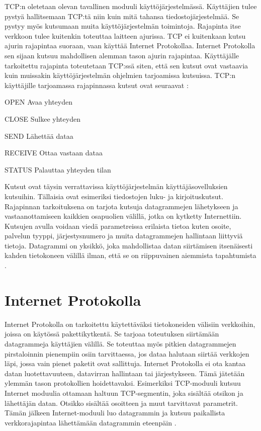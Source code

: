 \documentclass[utf8]{gradu3}
\begin{document}
TCP:n oletetaan olevan tavallinen moduuli käyttöjärjestelmässä. Käyttäjien tulee pystyä hallitsemaan TCP:tä niin kuin mitä tahansa tiedostojärjestelmää. Se pystyy myös kutsumaan muita käyttöjärjestelmän toimintoja. Rajapinta itse verkkoon tulee kuitenkin toteuttaa laitteen ajurissa. TCP ei kuitenkaan kutsu ajurin rajapintaa suoraan, vaan käyttää Internet Protokollaa. Internet Protokolla sen sijaan kutsuu mahdollisen alemman tason ajurin rajapintaa. Käyttäjälle tarkoitettu rajapinta toteutetaan TCP:ssä siten, että sen kutsut ovat vastaavia kuin muissakin käyttöjärjestelmän ohjelmien tarjoamissa kutsuissa. TCP:n käyttäjille tarjoamassa rajapinnassa kutsut ovat seuraavat \parencite{tcp2_3}:

\begin{desclist}
\item[OPEN] Avaa yhteyden
\item[CLOSE] Sulkee yhteyden
\item[SEND] Lähettää dataa
\item[RECEIVE] Ottaa vastaan dataa
\item[STATUS] Palauttaa yhteyden tilan
\end{desclist}

Kutsut ovat täysin verrattavissa käyttöjärjestelmän käyttäjäsovelluksien kutsuihin. Tällaisia ovat esimeriksi tiedostojen luku- ja kirjoituskutsut. Rajapinnan tarkoituksena on tarjota kutsuja datagrammejen lähetykseen ja vastaanottamiseen kaikkien osapuolien välillä, jotka on kytketty Internettiin. Kutsujen avulla voidaan viedä parametreissa erilaista tietoa kuten osoite, palvelun tyyppi, järjestysnumero ja muita datagrammejen hallintaan liittyviä tietoja. Datagrammi on yksikkö, joka mahdollistaa datan siirtämisen itsenäisesti kahden tietokoneen välillä ilman, että se on riippuvainen aiemmista tapahtumista \parencite[s.33]{datagram}.

\section{Internet Protokolla}

Internet Protokolla on tarkoitettu käytettäväksi tietokoneiden välisiin verkkoihin, joissa on käytössä pakettikytkentä. Se tarjoaa toteutuksen siirtämään datagrammeja käyttäjien välillä. Se toteuttaa myös pitkien datagrammejen pirstaloinnin pienempiin osiin tarvittaessa, jos dataa halutaan siirtää verkkojen läpi, jossa vain pienet paketit ovat sallittuja. Internet Protokolla ei ota kantaa datan luotettavuuteen, datavirran hallintaan tai järjestykseen. Tämä jätetään ylemmän tason protokollien hoidettavaksi. Esimerkiksi TCP-moduuli kutsuu Internet moduulia ottamaan haltuun TCP-segmentin, joka sisältää otsikon ja lähettäjän datan. Otsikko sisältää osoitteen ja muut tarvittavat parametrit. Tämän jälkeen Internet-moduuli luo datagrammin ja kutsuu paikallista verkkorajapintaa lähettämään datagrammin eteenpäin \parencite{internet_protocol}.
\end{document}
